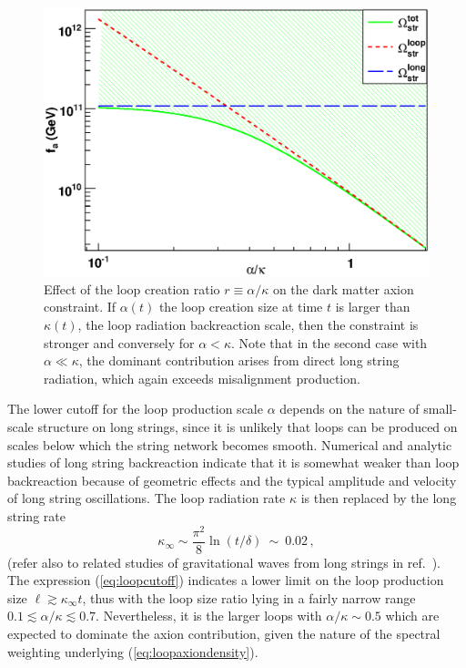 \documentclass[preprint,nofootinbib]{revtex4}
\begin{document}
\begin{figure}[tbp]
\begin{center}
\includegraphics[width=\figwidth,clip=true,trim=0mm 0mm 15mm 10mm]{RatioFa}
\caption{Effect of the loop creation ratio $r\equiv\alpha/\kappa$ on the dark matter axion constraint. If $\alpha(t)$ the loop creation size at time $t$ is larger than $\kappa(t)$, the loop radiation backreaction scale, then the constraint is stronger and conversely for $\alpha < \kappa$. Note that in the second case with $\alpha \ll \kappa$, the dominant contribution arises from direct long string radiation, which again exceeds misalignment production.}
\label{fig:string:uncertainties}
\end{center}
\end{figure}

The lower cutoff for the loop production scale $\alpha$ depends on the nature of small-scale structure on long strings, since it is unlikely that loops can be produced on scales below which the string network becomes smooth. Numerical and analytic studies of long string backreaction indicate that it is somewhat weaker than loop backreaction because of geometric effects and the typical amplitude and velocity of long string oscillations. The loop radiation rate $\kappa$ is then replaced by the long string rate \cite{Battye:1995hw} 
\begin{equation}
\kappa_\infty \sim \frac{\pi^2}{8}\ln(t/\delta) ~\sim~ 0.02\,,\label{eq:loopcutoff}
\end{equation}
(refer also to related studies of gravitational waves from long strings in ref.~\cite{Olum:1999sg}). The expression (\ref{eq:loopcutoff}) indicates a lower limit on the loop production size $\ell \gtrsim \kappa_\infty t$, thus with the loop size ratio lying in a fairly narrow range $0.1 \lesssim \alpha/\kappa \lesssim 0.7$. Nevertheless, it is the larger loops with $\alpha/\kappa \sim 0.5$ which are expected to dominate the axion contribution, given the nature of the spectral weighting underlying (\ref{eq:loopaxiondensity}).
\end{document}

